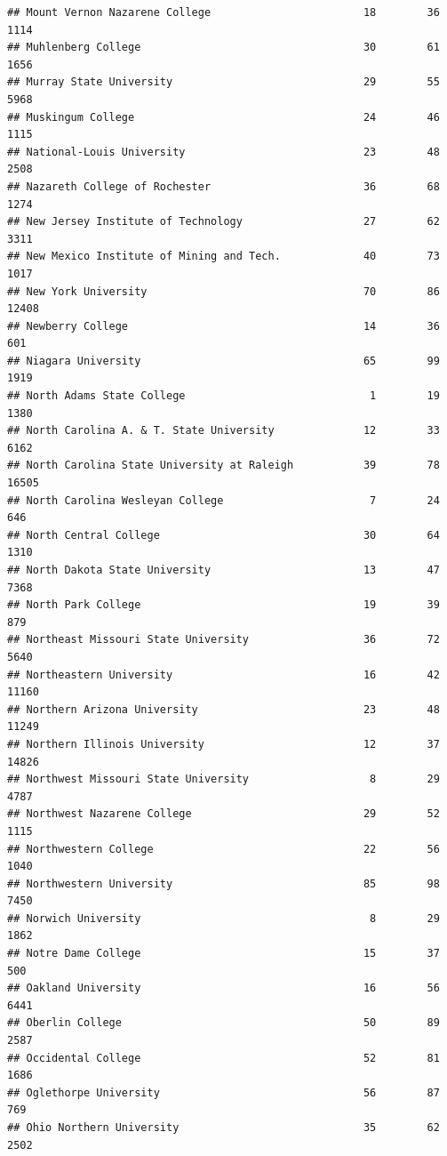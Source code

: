 \documentclass[
]{article}
\begin{document}
\begin{verbatim}
## Mount Vernon Nazarene College                        18        36        1114
## Muhlenberg College                                   30        61        1656
## Murray State University                              29        55        5968
## Muskingum College                                    24        46        1115
## National-Louis University                            23        48        2508
## Nazareth College of Rochester                        36        68        1274
## New Jersey Institute of Technology                   27        62        3311
## New Mexico Institute of Mining and Tech.             40        73        1017
## New York University                                  70        86       12408
## Newberry College                                     14        36         601
## Niagara University                                   65        99        1919
## North Adams State College                             1        19        1380
## North Carolina A. & T. State University              12        33        6162
## North Carolina State University at Raleigh           39        78       16505
## North Carolina Wesleyan College                       7        24         646
## North Central College                                30        64        1310
## North Dakota State University                        13        47        7368
## North Park College                                   19        39         879
## Northeast Missouri State University                  36        72        5640
## Northeastern University                              16        42       11160
## Northern Arizona University                          23        48       11249
## Northern Illinois University                         12        37       14826
## Northwest Missouri State University                   8        29        4787
## Northwest Nazarene College                           29        52        1115
## Northwestern College                                 22        56        1040
## Northwestern University                              85        98        7450
## Norwich University                                    8        29        1862
## Notre Dame College                                   15        37         500
## Oakland University                                   16        56        6441
## Oberlin College                                      50        89        2587
## Occidental College                                   52        81        1686
## Oglethorpe University                                56        87         769
## Ohio Northern University                             35        62        2502

\end{verbatim}
\end{document}
